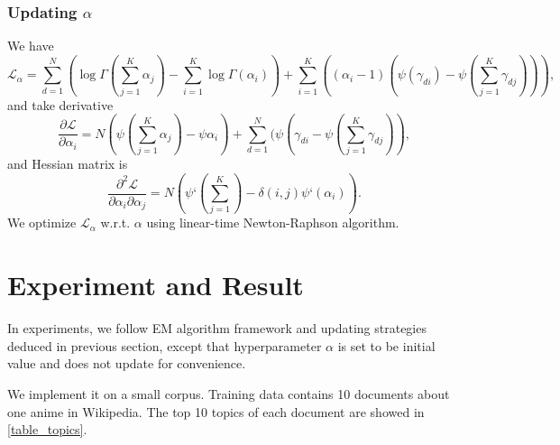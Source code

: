 \documentclass{article}
\begin{document}
\subsubsection{Updating $ \alpha $}
We have \begin{equation*}
	\mathcal{L}_{\alpha} = \sum^{N}_{d=1} (\log\Gamma(\sum^{K}_{j=1}\alpha_j) - \sum^{K}_{i=1}\log\Gamma(\alpha_i)) + \sum^{K}_{i=1} ((\alpha_i-1) (\psi(\gamma_{di}) - \psi(\sum^{K}_{j=1}\gamma_{dj}))),
\end{equation*}
and take derivative
\begin{equation*}
	\frac{\partial{\mathcal{L}}}{\partial{\alpha_{i}}} = N(\psi(\sum^{K}_{j=1}\alpha_j) - \psi\alpha_i) + \sum^{N}_{d=1}(\psi(\gamma_{di} - \psi(\sum^{K}_{j=1}\gamma_{dj})),
\end{equation*}
and Hessian matrix is
\begin{equation*}
	\frac{\partial^{2}\mathcal{L}}{\partial{\alpha_{i}}\partial{\alpha_{j}}} = N(\psi{‘}(\sum^{K}_{j=1}) - \delta(i,j)\psi{‘}(\alpha_i)).
\end{equation*}
We optimize $ \mathcal{L}_{\alpha} $ w.r.t. $ \alpha $ using linear-time Newton-Raphson algorithm.

\section{Experiment and Result}

In experiments, we follow EM algorithm framework and updating strategies deduced in previous section, except that hyperparameter $ \alpha $ is set to be initial value and does not update for convenience.

We implement it on a small corpus. Training data contains 10 documents about one anime in Wikipedia. The top 10 topics of each document are showed in \ref{table_topics}.
\end{document}
